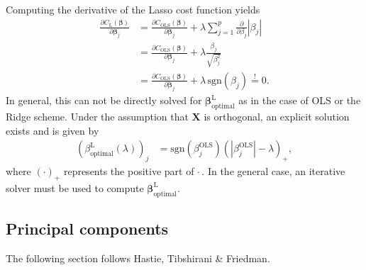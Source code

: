 \documentclass[a4paper]{article}
\begin{document}
\begin{multicols}{2}
Computing the derivative of the Lasso cost function yields
\begin{align}
\frac{\partial C_\text{L}(\bm\beta)}{\partial \bm\beta_j} &=  \frac{\partial C_\text{OLS}(\bm\beta)}{\partial \bm\beta_j} + \lambda \sum_{j=1}^p \frac{\partial}{\partial \beta_j} |\beta_j| \nonumber \\
%
&= \frac{\partial C_\text{OLS}(\bm\beta)}{\partial \bm\beta_j} + \lambda\frac{\beta_j}{\sqrt{\beta_j^2}} \nonumber \\
%
&= \frac{\partial C_\text{OLS}(\bm\beta)}{\partial \bm\beta_j} + \lambda\,\text{sgn}(\beta_j) \stackrel{!}{=} 0.
\end{align}
In general, this can not be directly solved for $\bm\beta_\text{optimal}^\text{L}$ as in the case of OLS or the Ridge scheme. Under the assumption that $\mathbf{X}$ is orthogonal, an explicit solution exists and is given by\autocite{mehta2018highbias}
\begin{align}
\left(\beta_\text{optimal}^\text{L}(\lambda)\right)_j &= \text{sgn}(\beta_j^\text{OLS})\left(|\beta_j^\text{OLS}| - \lambda\right)_+,
\end{align}
where $(\cdot)_+$ represents the positive part of $\cdot\,$. In the general case, an iterative solver must be used to compute $\bm\beta_\text{optimal}^\text{L}$.

\subsection{Principal components}
The following section follows Hastie, Tibshirani \& Friedman\autocite{trevor2009elements}.


\end{multicols}
\end{document}
